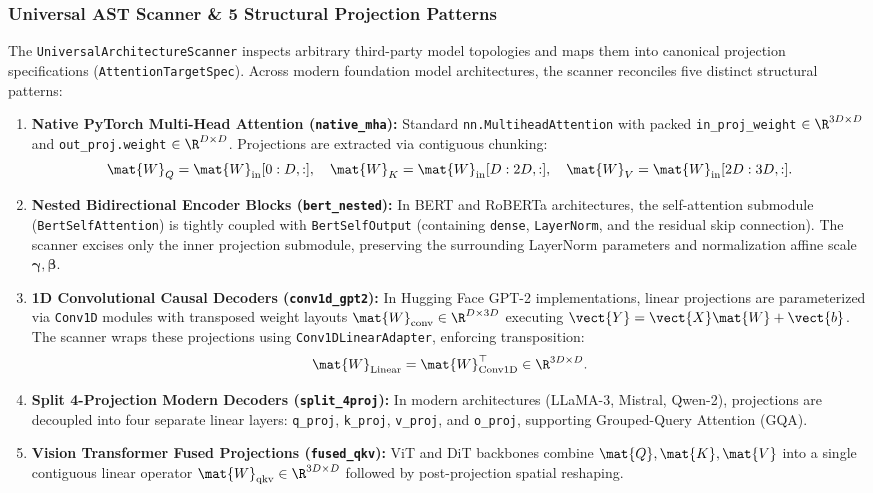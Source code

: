 \subsubsection{Universal AST Scanner \& 5 Structural Projection Patterns}
The \texttt{UniversalArchitectureScanner} inspects arbitrary third-party model topologies and maps them into canonical projection specifications (\texttt{AttentionTargetSpec}). Across modern foundation model architectures, the scanner reconciles five distinct structural patterns:
\begin{enumerate}
    \item \textbf{Native PyTorch Multi-Head Attention (\texttt{native\_mha}):} Standard \texttt{nn.MultiheadAttention} with packed \texttt{in\_proj\_weight} $\in \R^{3D \times D}$ and \texttt{out\_proj.weight} $\in \R^{D \times D}$. Projections are extracted via contiguous chunking:
    \begin{equation}
    \mat{W}_Q = \mat{W}_{\text{in}}[0:D, :], \quad \mat{W}_K = \mat{W}_{\text{in}}[D:2D, :], \quad \mat{W}_V = \mat{W}_{\text{in}}[2D:3D, :].
    \end{equation}
    \item \textbf{Nested Bidirectional Encoder Blocks (\texttt{bert\_nested}):} In BERT and RoBERTa architectures, the self-attention submodule (\texttt{BertSelfAttention}) is tightly coupled with \texttt{BertSelfOutput} (containing \texttt{dense}, \texttt{LayerNorm}, and the residual skip connection). The scanner excises only the inner projection submodule, preserving the surrounding LayerNorm parameters and normalization affine scale $\bm{\gamma}, \bm{\beta}$.
    \item \textbf{1D Convolutional Causal Decoders (\texttt{conv1d\_gpt2}):} In Hugging Face GPT-2 implementations, linear projections are parameterized via \texttt{Conv1D} modules with transposed weight layouts $\mat{W}_{\text{conv}} \in \R^{D \times 3D}$ executing $\vect{Y} = \vect{X}\mat{W} + \vect{b}$. The scanner wraps these projections using \texttt{Conv1DLinearAdapter}, enforcing transposition:
    \begin{equation}
    \mat{W}_{\text{Linear}} = \mat{W}_{\text{Conv1D}}^\top \in \R^{3D \times D}.
    \end{equation}
    \item \textbf{Split 4-Projection Modern Decoders (\texttt{split\_4proj}):} In modern architectures (LLaMA-3, Mistral, Qwen-2), projections are decoupled into four separate linear layers: \texttt{q\_proj}, \texttt{k\_proj}, \texttt{v\_proj}, and \texttt{o\_proj}, supporting Grouped-Query Attention (GQA).
    \item \textbf{Vision Transformer Fused Projections (\texttt{fused\_qkv}):} ViT and DiT backbones combine $\mat{Q}, \mat{K}, \mat{V}$ into a single contiguous linear operator $\mat{W}_{\text{qkv}} \in \R^{3D \times D}$ followed by post-projection spatial reshaping.
\end{enumerate}

